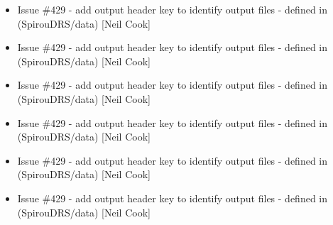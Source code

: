 \documentclass[a4paper,10pt,english]{report}
\begin{document}
\begin{itemize}
\item {} 
Issue \#429 - add output header key to identify output files
 - defined in  (SpirouDRS/data) {[}Neil Cook{]}

\item {} 
Issue \#429 - add output header key to identify output files
 - defined in  (SpirouDRS/data) {[}Neil Cook{]}

\item {} 
Issue \#429 - add output header key to identify output files
 - defined in  (SpirouDRS/data) {[}Neil Cook{]}

\item {} 
Issue \#429 - add output header key to identify output files
 - defined in  (SpirouDRS/data) {[}Neil Cook{]}

\item {} 
Issue \#429 - add output header key to identify output files
 - defined in  (SpirouDRS/data) {[}Neil Cook{]}

\item {} 
Issue \#429 - add output header key to identify output files
 - defined in  (SpirouDRS/data) {[}Neil Cook{]}

\end{itemize}
\end{document}
